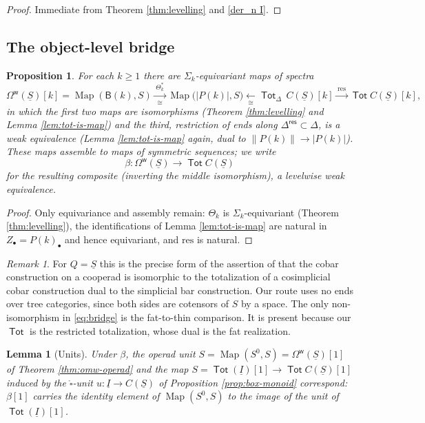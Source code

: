\documentclass[12pt]{amsart}
\newtheorem{lemma}[subsection]{Lemma}
\newtheorem{proposition}[subsection]{Proposition}
\theoremstyle{definition}
\theoremstyle{remark}
\newtheorem{remark}[subsection]{Remark}
\newcommand{\Tot}{\operatorname{\mathsf{Tot}}}
\newcommand{\Map}{\operatorname{Map}}
\newcommand{\boxcirc}{\mathring{\square}}
\newcommand{\uS}{\underline{S}}
\newcommand{\BC}{\mathsf{B}}                     %
\newcommand{\Omw}{\Omega^{\mathsf{w}}}           %
\newcommand{\Thet}{\Theta}                       %
\newcommand{\fat}[1]{\lVert #1 \rVert}           %
\newcommand{\Dres}{\Delta^{\mathsf{res}}}
\begin{document}
\begin{proof}
Immediate from Theorem \ref{thm:levelling} and \eqref{der_n I}.
\end{proof}

\subsection{The object-level bridge}\label{sec:bridge}

\begin{proposition}\label{prop:bridge}
For each $k\geq 1$ there are $\Sigma_k$-equivariant maps of spectra
\begin{equation}\label{eq:bridge}
 \Omw(\uS)[k] = \Map(\BC(k), S) \xrightarrow[\cong]{\,\Thet_k^{*}\,} \Map\big(|P(k)|, S\big) \xleftarrow[\cong]{\ \ } \Tot_{\Delta}\, C(\uS)[k] \xrightarrow{\,\mathrm{res}\,} \Tot C(\uS)[k],
\end{equation}
in which the first two maps are isomorphisms (Theorem \ref{thm:levelling} and Lemma \ref{lem:tot-is-map}) and the third, restriction of ends along $\Dres\subset \Delta$, is a weak equivalence (Lemma \ref{lem:tot-is-map} again, dual to $\fat{P(k)}\to |P(k)|$). These maps assemble to maps of symmetric sequences; we write
\[ \beta\colon \Omw(\uS) \longrightarrow \Tot C(\uS) \]
for the resulting composite (inverting the middle isomorphism), a levelwise weak equivalence.
\end{proposition}

\begin{proof}
Only equivariance and assembly remain: $\Thet_k$ is $\Sigma_k$-equivariant (Theorem \ref{thm:levelling}), the identifications of Lemma \ref{lem:tot-is-map} are natural in $Z_\bullet = P(k)_{\bullet}$ and hence equivariant, and $\mathrm{res}$ is natural.
\end{proof}

\begin{remark}\label{rem:phi-vs-ching52}
For $Q = \uS$ this is the precise form of the assertion of \cite[Remark 5.2]{Ching-thesis} that the cobar construction on a cooperad is isomorphic to the totalization of a cosimplicial cobar construction dual to the simplicial bar construction. Our route uses no ends over tree categories, since both sides are cotensors of $S$ by a space. The only non-isomorphism in \eqref{eq:bridge} is the fat-to-thin comparison. It is present because our $\Tot$ is the restricted totalization, whose dual is the fat realization.
\end{remark}

\begin{lemma}[Units]\label{lem:units-bridge}
Under $\beta$, the operad unit $S = \Map(S^0, S) = \Omw(\uS)[1]$ of Theorem \ref{thm:omw-operad} and the map $S = \Tot(\underline{I})[1]\to \Tot C(\uS)[1]$ induced by the $\boxcirc$-unit $u\colon \underline{I}\to C(\uS)$ of Proposition \ref{prop:box-monoid} correspond: $\beta[1]$ carries the identity element of $\Map(S^0,S)$ to the image of the unit of $\Tot(\underline{I})[1]$.
\end{lemma}
\end{document}
